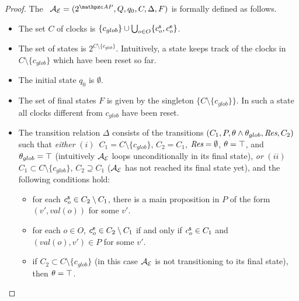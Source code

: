 \begin{proof}
The  \TA\ $\Au_{\mathcal{E}}=\tpl{2^{\Prop},Q,q_0,C,\Delta,F}$ is formally defined as follows.
\begin{itemize}
    \item The set $C$ of clocks is  $\{c_{glob}\}\cup \bigcup_{o\in O}\{c_o^{\mathsf{s}},c_o^{\mathsf{e}}\}$.
    \item The set of states is $2^{C\setminus \{c_{glob}\}}$. Intuitively, a state keeps track of the clocks in $C\setminus \{c_{glob}\}$ which have been reset so far.
    \item The initial  state $q_0$ is  $\emptyset$.
    \item The set of final states $F$ is given by the singleton $\{C\setminus \{c_{glob}\}\}$. In such a state all clocks different from $c_{glob}$ have been reset.
    \item The transition relation
$\Delta$ consists of the transitions $(C_1,P,\theta\wedge \theta_{glob},\textit{Res},C_2)$ such that \emph{either} $(i)$~$C_1 = C\setminus \{c_{glob}\}$, $C_2=C_1$, $\textit{Res}=\emptyset$,  $\theta = \operatorname{\top}$, and
$\theta_{glob} =\operatorname{\top}$ (intuitively $\mathcal{A}_{\mathcal{E}}$ loops unconditionally in its final state),
\emph{or} $(ii)$~$C_1 \subset C\setminus \{c_{glob}\}$, $C_2 \supseteq C_1$ ($\mathcal{A}_{\mathcal{E}}$ has not reached its final state yet), and the following conditions hold:
\begin{itemize}
    \item for each $c_o^{\mathsf{s}}\in C_2\setminus C_1$, there is a main proposition  in $P$ of the form $(v',val(o))$  for some $v'$.
    \item  for each $o\in O$, $c_o^{\mathsf{e}}\in C_2\setminus C_1$ if and only if $c_o^{\mathsf{s}}\in C_1$ and $(val(o),v')\in P$ for some $v'$.
     \item if $C_2\subset C\setminus \{c_{glob}\}$ (in this case $\mathcal{A}_{\mathcal{E}}$ is not transitioning to its final state), then $\theta= \operatorname{\top}$.
     

\end{itemize}
\end{itemize}
\end{proof}
